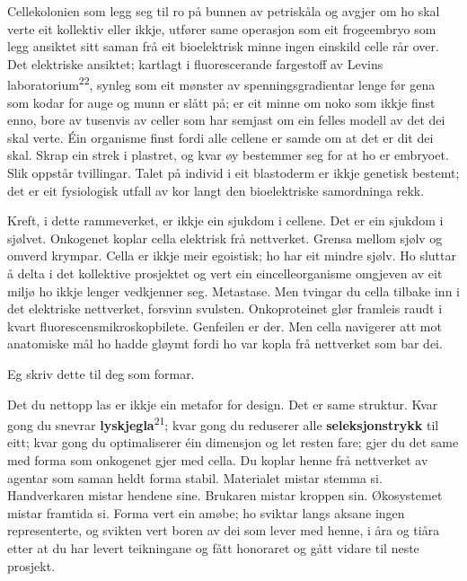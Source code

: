 \begin{widebody}
{\small

Cellekolonien som legg seg til ro på bunnen av petriskåla og avgjer om ho skal verte eit kollektiv eller ikkje, utfører same operasjon som eit frogeembryo som legg ansiktet sitt saman frå eit bioelektrisk minne ingen einskild celle rår over. Det elektriske ansiktet; kartlagt i fluorescerande fargestoff av Levins laboratorium\textsuperscript{22}, synleg som eit mønster av spenningsgradientar lenge før gena som kodar for auge og munn er slått på; er eit minne om noko som ikkje finst enno, bore av tusenvis av celler som har semjast om ein felles modell av det dei skal verte. Éin organisme finst fordi alle cellene er samde om at det er dit dei skal. Skrap ein strek i plastret, og kvar øy bestemmer seg for at ho er embryoet. Slik oppstår tvillingar. Talet på individ i eit blastoderm er ikkje genetisk bestemt; det er eit fysiologisk utfall av kor langt den bioelektriske samordninga rekk.

Kreft, i dette rammeverket, er ikkje ein sjukdom i cellene. Det er ein sjukdom i sjølvet. Onkogenet koplar cella elektrisk frå nettverket. Grensa mellom sjølv og omverd krympar. Cella er ikkje meir egoistisk; ho har eit mindre sjølv. Ho sluttar å delta i det kollektive prosjektet og vert ein eincelleorganisme omgjeven av eit miljø ho ikkje lenger vedkjenner seg. Metastase. Men tvingar du cella tilbake inn i det elektriske nettverket, forsvinn svulsten. Onkoproteinet glør framleis raudt i kvart fluorescensmikroskopbilete. Genfeilen er der. Men cella navigerer att mot anatomiske mål ho hadde gløymt fordi ho var kopla frå nettverket som bar dei.

Eg skriv dette til deg som formar.

Det du nettopp las er ikkje ein metafor for design. Det er same struktur. Kvar gong du snevrar \textbf{lyskjegla}\textsuperscript{21}; kvar gong du reduserer alle \textbf{seleksjonstrykk} til eitt; kvar gong du optimaliserer éin dimensjon og let resten fare; gjer du det same med forma som onkogenet gjer med cella. Du koplar henne frå nettverket av agentar som saman heldt forma stabil. Materialet mistar stemma si. Handverkaren mistar hendene sine. Brukaren mistar kroppen sin. Økosystemet mistar framtida si. Forma vert ein amøbe; ho sviktar langs aksane ingen representerte, og svikten vert boren av dei som lever med henne, i åra og tiåra etter at du har levert teikningane og fått honoraret og gått vidare til neste prosjekt.

}
\end{widebody}
